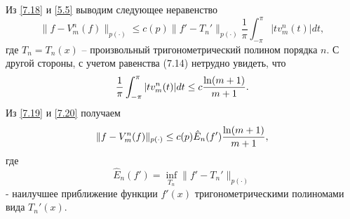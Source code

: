 Из \eqref{7.18} и \eqref{5.5} выводим следующее неравенство
\begin{equation}\label{7.19}
    \|f-V_m^n(f)\|_{p(\cdot)}\le c(p)\|f'-T_n'\|_{p(\cdot)}\frac1\pi\int_{-\pi}^\pi |tv_m^n(t)|dt,
\end{equation}
где $T_n=T_n(x)$ -- произвольный тригонометрический полином порядка $n$. С другой стороны, с учетом равенства (7.14) нетрудно увидеть, что
\begin{equation}\label{7.20}
    \frac1\pi\int_{-\pi}^\pi |tv_m^n(t)|dt\le c{\ln(m+1)\over m+1}.
\end{equation}
Из \eqref{7.19} и \eqref{7.20} получаем
\begin{equation}\label{7.21}
    \|f-V_m^n(f)\|_{p(\cdot)}\le c(p) {\hat E}_n(f'){\ln(m+1)\over m+1},
\end{equation}
где
\begin{equation}\label{7.22}
    {\hat E}_n(f')=\inf_{T_n}\|f'-T_n'\|_{p(\cdot)}
\end{equation}
- наилучшее приближение функции $f'(x)$ тригонометрическими полиномами вида $T_n'(x)$.

